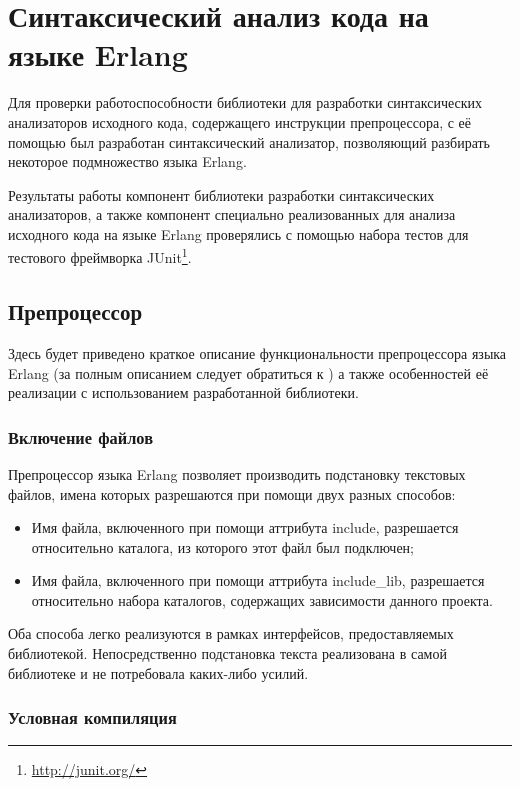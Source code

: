 \clearpage

\section{Синтаксический анализ кода на языке Erlang}

Для проверки работоспособности библиотеки для разработки синтаксических анализаторов исходного кода, содержащего инструкции препроцессора, с её помощью был разработан синтаксический анализатор, позволяющий разбирать некоторое подмножество языка Erlang.

Результаты работы компонент библиотеки разработки синтаксических анализаторов, а также компонент специально реализованных для анализа исходного кода на языке Erlang проверялись с помощью набора тестов для тестового фреймворка JUnit\footnote{\url{http://junit.org/}}.

\subsection{Препроцессор}

Здесь будет приведено краткое описание функциональности препроцессора языка Erlang (за полным описанием следует обратиться к \cite{erlangpreprocessor}) а также особенностей её реализации с использованием разработанной библиотеки.

\subsubsection{Включение файлов}

Препроцессор языка Erlang позволяет производить подстановку текстовых файлов, имена которых разрешаются при помощи двух разных способов:

\begin{itemize}
\item Имя файла, включенного при помощи аттрибута include, разрешается относительно каталога, из которого этот файл был подключен;
\item Имя файла, включенного при помощи аттрибута include\_lib, разрешается относительно набора каталогов, содержащих зависимости данного проекта.
\end{itemize}

Оба способа легко реализуются в рамках интерфейсов, предоставляемых библиотекой. Непосредственно подстановка текста реализована в самой библиотеке и не потребовала каких-либо усилий.

\subsubsection{Условная компиляция}

